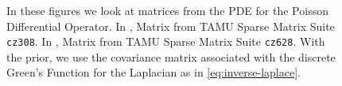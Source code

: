 \documentclass[10pt]{article}
\newcommand{\ccref}[1]{\textcolor{darkred}{\cref{#1}}}
\theoremstyle{plain}
\theoremstyle{definition}
\theoremstyle{remark}
\begin{document}
\begin{figure}[!h]
\begin{minipage}{.5\textwidth}
		\label{fig:cz628}
	\end{minipage}%
	\caption{In these figures we look at matrices from the PDE for the Poisson Differential Operator. In \figleft, Matrix from TAMU Sparse Matrix Suite \texttt{cz308}. In \figright, Matrix from TAMU Sparse Matrix Suite \texttt{cz628}. With the prior, we use the covariance matrix associated with the discrete Green's Function for the Laplacian as in \ccref{eq:inverse-laplace}.}
	\label{fig:cz}
\end{figure}
\end{document}
